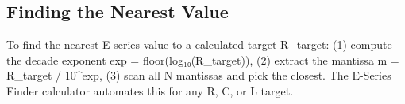 				

\subsection{Finding the Nearest Value}

				

To find the nearest E-series value to a calculated target R\_target: (1) compute the decade exponent exp = floor(log₁₀(R\_target)), (2) extract the mantissa m = R\_target / 10\textasciicircum{}exp, (3) scan all N mantissas and pick the closest. The E-Series Finder calculator automates this for any R, C, or L target.



